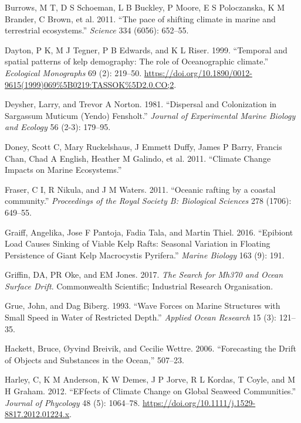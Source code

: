 \documentclass[
]{article}
\begin{document}
\leavevmode\hypertarget{ref-Burrows2011}{}%
Burrows, M T, D S Schoeman, L B Buckley, P Moore, E S Poloczanska, K M
Brander, C Brown, et al. 2011. ``The pace of shifting climate in marine
and terrestrial ecosystems.'' \emph{Science} 334 (6056): 652--55.

\leavevmode\hypertarget{ref-Dayton1999}{}%
Dayton, P K, M J Tegner, P B Edwards, and K L Riser. 1999. ``Temporal
and spatial patterns of kelp demography: The role of Oceanographic
climate.'' \emph{Ecological Monographs} 69 (2): 219--50.
\url{https://doi.org/10.1890/0012-9615(1999)069\%5B0219:TASSOK\%5D2.0.CO;2}.

\leavevmode\hypertarget{ref-deysher1981}{}%
Deysher, Larry, and Trevor A Norton. 1981. ``Dispersal and Colonization
in Sargassum Muticum (Yendo) Fensholt.'' \emph{Journal of Experimental
Marine Biology and Ecology} 56 (2-3): 179--95.

\leavevmode\hypertarget{ref-doney2011}{}%
Doney, Scott C, Mary Ruckelshaus, J Emmett Duffy, James P Barry, Francis
Chan, Chad A English, Heather M Galindo, et al. 2011. ``Climate Change
Impacts on Marine Ecosystems.''

\leavevmode\hypertarget{ref-Fraser2011}{}%
Fraser, C I, R Nikula, and J M Waters. 2011. ``Oceanic rafting by a
coastal community.'' \emph{Proceedings of the Royal Society B:
Biological Sciences} 278 (1706): 649--55.

\leavevmode\hypertarget{ref-graiff2016}{}%
Graiff, Angelika, Jose F Pantoja, Fadia Tala, and Martin Thiel. 2016.
``Epibiont Load Causes Sinking of Viable Kelp Rafts: Seasonal Variation
in Floating Persistence of Giant Kelp Macrocystis Pyrifera.''
\emph{Marine Biology} 163 (9): 191.

\leavevmode\hypertarget{ref-griffin2017}{}%
Griffin, DA, PR Oke, and EM Jones. 2017. \emph{The Search for Mh370 and
Ocean Surface Drift}. Commonwealth Scientific; Industrial Research
Organisation.

\leavevmode\hypertarget{ref-grue1993}{}%
Grue, John, and Dag Biberg. 1993. ``Wave Forces on Marine Structures
with Small Speed in Water of Restricted Depth.'' \emph{Applied Ocean
Research} 15 (3): 121--35.

\leavevmode\hypertarget{ref-hackett2006}{}%
Hackett, Bruce, Øyvind Breivik, and Cecilie Wettre. 2006. ``Forecasting
the Drift of Objects and Substances in the Ocean,'' 507--23.

\leavevmode\hypertarget{ref-Harley2012}{}%
Harley, C, K M Anderson, K W Demes, J P Jorve, R L Kordas, T Coyle, and
M H Graham. 2012. ``EFfects of Climate Change on Global Seaweed
Communities.'' \emph{Journal of Phycology} 48 (5): 1064--78.
\url{https://doi.org/10.1111/j.1529-8817.2012.01224.x}.
\end{document}
